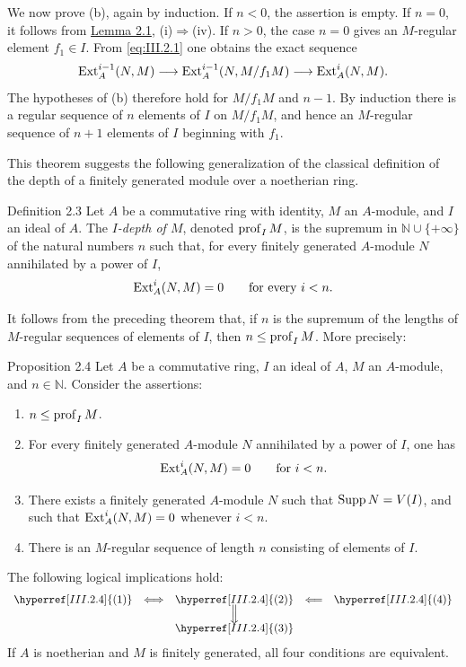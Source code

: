We now prove (b), again by induction. If $n<0$, the assertion is
empty. If $n=0$, it follows from \hyperref[III.2.1]{Lemma 2.1}, (i)$\Rightarrow$(iv). If $n>0$,
the case $n=0$ gives an $M$-regular element $f_1\in I$. From
\eqref{eq:III.2.1} one obtains the exact sequence
\begin{equation}\label{eq:III.2.2}
  \operatorname{Ext}_A^{i-1}(N,M)\longrightarrow
  \operatorname{Ext}_A^{i-1}(N,M/f_1M)\longrightarrow\operatorname{Ext}_A^i(N,M).
\end{equation}
The hypotheses of (b) therefore hold for $M/f_1M$ and $n-1$. By induction
there is a regular sequence of $n$ elements of $I$ on $M/f_1M$, and hence
an $M$-regular sequence of $n+1$ elements of $I$ beginning with $f_1$.

This theorem suggests the following generalization of the classical
definition of the depth of a finitely generated module over a noetherian
ring.

\begin{sgastatement}{Definition 2.3}
Let $A$ be a commutative ring with identity, $M$ an $A$-module, and $I$ an
ideal of $A$. The \emph{$I$-depth of $M$}, denoted $\operatorname{prof}_I M$, is the
supremum in $\mathbb N\cup\{+\infty\}$ of the natural numbers $n$ such
that, for every finitely generated $A$-module $N$ annihilated by a power of
$I$,
\[
  \operatorname{Ext}_A^i(N,M)=0\qquad\text{for every }i<n.
\]
\end{sgastatement}

It follows from the preceding theorem that, if $n$ is the supremum of the
lengths of $M$-regular sequences of elements of $I$, then
$n\le\operatorname{prof}_I M$. More precisely:

\begin{sgastatement}{Proposition 2.4}
Let $A$ be a commutative ring, $I$ an ideal of $A$, $M$ an $A$-module,
and $n\in\mathbb N$. Consider the assertions:
\begin{enumerate}[label=\textup{(\arabic*)},leftmargin=2.7em]
\item $n\le\operatorname{prof}_I M$.
\item For every finitely generated $A$-module $N$ annihilated by a power
of $I$, one has
\[
  \operatorname{Ext}_A^i(N,M)=0\qquad\text{for }i<n.
\]
\item There exists a finitely generated $A$-module $N$ such that
$\operatorname{Supp} N=V(I)$, and such that $\operatorname{Ext}_A^i(N,M)=0$ whenever $i<n$.
\item There is an $M$-regular sequence of length $n$ consisting of
elements of $I$.
\end{enumerate}
The following logical implications hold:
\[
\begin{array}{ccccc}
\hyperref[III.2.4]{(1)}&\Longleftrightarrow&\hyperref[III.2.4]{(2)}&\Longleftarrow&\hyperref[III.2.4]{(4)}\\[-0.2em]
&&\Big\Downarrow&&\\[-0.2em]
&&\hyperref[III.2.4]{(3)}&&
\end{array}
\]
If $A$ is noetherian and $M$ is finitely generated, all four conditions are
equivalent.
\end{sgastatement}

